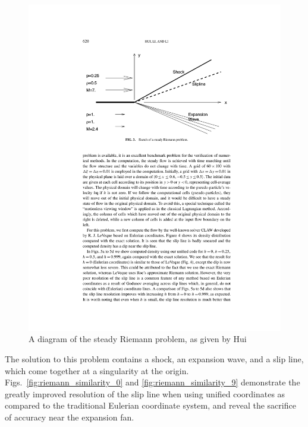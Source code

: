 \documentclass[12pt,letterpaper]{article}
\begin{document}
\begin{figure}[htbp]
\centering
\includegraphics[width=\textwidth]{steadyriemann.pdf}
\caption[A Diagram of the Steady Riemann Problem]{A diagram of the steady Riemann problem, as given by
  Hui\cite{hui99}}
\label{fig:steadyriemann}
\end{figure}

The solution to this problem contains a shock, an expansion wave, and a slip line, which come together at a singularity at the origin.
Figs.~\ref{fig:riemann_similarity_0} and \ref{fig:riemann_similarity_9} demonstrate the greatly improved resolution of the slip line when using unified coordinates as compared to the traditional Eulerian coordinate system, and reveal the sacrifice of accuracy near the expansion fan. 
\end{document}
